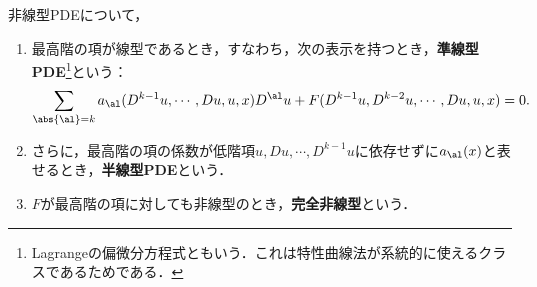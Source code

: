 \documentclass[uplatex,dvipdfmx]{jsreport}
\begin{document}
\begin{definition}
    非線型PDEについて，
    \begin{enumerate}
        \item 最高階の項が線型であるとき，すなわち，次の表示を持つとき，\textbf{準線型PDE}\footnote{Lagrangeの偏微分方程式ともいう．これは特性曲線法が系統的に使えるクラスであるためである．}という：
        \[\sum_{\abs{\al}=k}a_\al(D^{k-1}u,\cdots,Du,u,x)D^\al u+F(D^{k-1}u,D^{k-2}u,\cdots,Du,u,x)=0.\]
        \item さらに，最高階の項の係数が低階項$u,Du,\cdots,D^{k-1}u$に依存せずに$a_\al(x)$と表せるとき，\textbf{半線型PDE}という．
        \item $F$が最高階の項に対しても非線型のとき，\textbf{完全非線型}という．
    \end{enumerate}
\end{definition}
\end{document}
